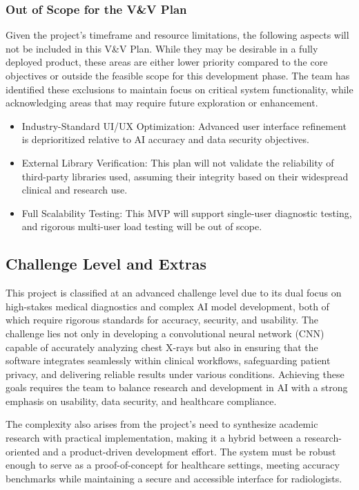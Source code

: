 \documentclass[12pt, titlepage]{article}
\begin{document}
\subsubsection{Out of Scope for the V\&V Plan}
Given the project’s timeframe and resource limitations, the following aspects will not be included in this V\&V Plan. While they may be desirable in a fully deployed product, these areas are either lower priority compared to the core objectives or outside the feasible scope for this development phase. The team has identified these exclusions to maintain focus on critical system functionality, while acknowledging areas that may require future exploration or enhancement.
\begin{itemize}
  \item Industry-Standard UI/UX Optimization: Advanced user interface refinement is deprioritized relative to AI accuracy and data security objectives.
  \item External Library Verification: This plan will not validate the reliability of third-party libraries used, assuming their integrity based on their widespread clinical and research use.
  \item Full Scalability Testing: This MVP will support single-user diagnostic testing, and rigorous multi-user load testing will be out of scope.
\end{itemize}

\subsection{Challenge Level and Extras}
This project is classified at an advanced challenge level due to its dual focus on high-stakes medical diagnostics and complex AI model development, both of which require rigorous standards for accuracy, security, and usability. The challenge lies not only in developing a convolutional neural network (CNN) capable of accurately analyzing chest X-rays but also in ensuring that the software integrates seamlessly within clinical workflows, safeguarding patient privacy, and delivering reliable results under various conditions. Achieving these goals requires the team to balance research and development in AI with a strong emphasis on usability, data security, and healthcare compliance.

The complexity also arises from the project’s need to synthesize academic research with practical implementation, making it a hybrid between a research-oriented and a product-driven development effort. The system must be robust enough to serve as a proof-of-concept for healthcare settings, meeting accuracy benchmarks while maintaining a secure and accessible interface for radiologists.
\end{document}
